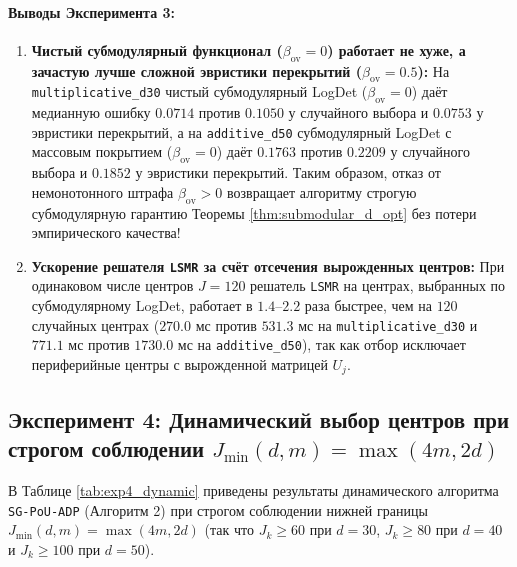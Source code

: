 \documentclass[11pt,a4paper]{article}
\theoremstyle{definition}
\theoremstyle{remark}
\begin{document}
\paragraph{Выводы Эксперимента 3:}
\begin{enumerate}
    \item \textbf{Чистый субмодулярный функционал ($\beta_{\mathrm{ov}} = 0$) работает не хуже, а зачастую лучше сложной эвристики перекрытий ($\beta_{\mathrm{ov}} = 0.5$):} На \texttt{multiplicative\_d30} чистый субмодулярный LogDet ($\beta_{\mathrm{ov}}=0$) даёт медианную ошибку $\mathbf{0.0714}$ против $0.1050$ у случайного выбора и $0.0753$ у эвристики перекрытий, а на \texttt{additive\_d50} субмодулярный LogDet с массовым покрытием ($\beta_{\mathrm{ov}}=0$) даёт $\mathbf{0.1763}$ против $0.2209$ у случайного выбора и $0.1852$ у эвристики перекрытий. Таким образом, отказ от немонотонного штрафа $\beta_{\mathrm{ov}} > 0$ возвращает алгоритму строгую субмодулярную гарантию Теоремы \ref{thm:submodular_d_opt} без потери эмпирического качества!
    \item \textbf{Ускорение решателя \texttt{LSMR} за счёт отсечения вырожденных центров:} При одинаковом числе центров $J = 120$ решатель \texttt{LSMR} на центрах, выбранных по субмодулярному LogDet, работает в $\mathbf{1.4\text{--}2.2}$ раза быстрее, чем на $120$ случайных центрах ($270.0$ мс против $531.3$ мс на \texttt{multiplicative\_d30} и $771.1$ мс против $1730.0$ мс на \texttt{additive\_d50}), так как отбор исключает периферийные центры с вырожденной матрицей $U_j$.
\end{enumerate}

\subsection{Эксперимент 4: Динамический выбор центров при строгом соблюдении $J_{\min}(d,m) = \max(4m, 2d)$}

В Таблице \ref{tab:exp4_dynamic} приведены результаты динамического алгоритма \texttt{SG-PoU-ADP} (Алгоритм 2) при строгом соблюдении нижней границы $J_{\min}(d,m) = \max(4m, 2d)$ (так что $J_k \ge 60$ при $d=30$, $J_k \ge 80$ при $d=40$ и $J_k \ge 100$ при $d=50$).
\end{document}
